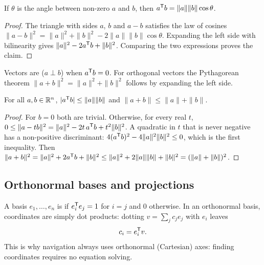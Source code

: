 \begin{proposition}
If $\theta$ is the angle between non-zero $a$ and $b$, then $a^{\mathsf{T}} b = \|a\|\|b\|\cos\theta$.
\end{proposition}
\begin{proof}
The triangle with sides $a$, $b$ and $a - b$ satisfies the law of cosines
$\|a - b\|^2 = \|a\|^2 + \|b\|^2 - 2\|a\|\|b\|\cos\theta$. Expanding the left side with bilinearity gives
$\|a\|^2 - 2a^{\mathsf{T}} b + \|b\|^2$. Comparing the two expressions proves the claim.
\end{proof}

Vectors are  ($a \perp b$) when $a^{\mathsf{T}} b = 0$. For orthogonal vectors the Pythagorean theorem
$\|a + b\|^2 = \|a\|^2 + \|b\|^2$ follows by expanding the left side.

\begin{theorem}
For all $a, b \in \mathbb{R}^n$, $|a^{\mathsf{T}} b| \le \|a\|\|b\|$ and $\|a + b\| \le \|a\| + \|b\|$.
\end{theorem}
\begin{proof}
For $b = 0$ both are trivial. Otherwise, for every real $t$, $0 \le \|a - tb\|^2 = \|a\|^2 - 2t\,a^{\mathsf{T}} b + t^2\|b\|^2$.
A quadratic in $t$ that is never negative has a non-positive discriminant: $4(a^{\mathsf{T}} b)^2 - 4\|a\|^2\|b\|^2 \le 0$,
which is the first inequality. Then
$\|a + b\|^2 = \|a\|^2 + 2a^{\mathsf{T}} b + \|b\|^2 \le \|a\|^2 + 2\|a\|\|b\| + \|b\|^2 = (\|a\| + \|b\|)^2$.
\end{proof}

\subsection{Orthonormal bases and projections}

A basis $e_1, \dots, e_n$ is  if $e_i^{\mathsf{T}} e_j = 1$ for $i = j$ and $0$ otherwise. In an orthonormal
basis, coordinates are simply dot products: dotting $v = \sum_j c_je_j$ with $e_i$ leaves
\begin{equation}
  c_i = e_i^{\mathsf{T}} v .
  \label{eq:onb-coords}
\end{equation}
This is why navigation always uses orthonormal (Cartesian) axes: finding coordinates requires no equation solving.

